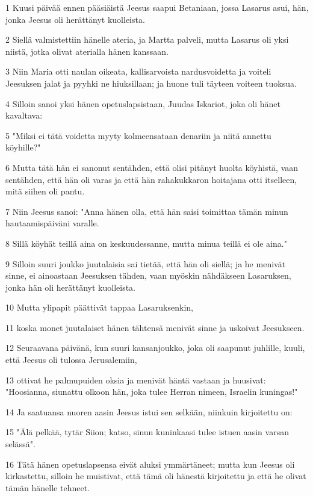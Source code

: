 \par 1 Kuusi päivää ennen pääsiäistä Jeesus saapui Betaniaan, jossa Lasarus asui, hän, jonka Jeesus oli herättänyt kuolleista.
\par 2 Siellä valmistettiin hänelle ateria, ja Martta palveli, mutta Lasarus oli yksi niistä, jotka olivat aterialla hänen kanssaan.
\par 3 Niin Maria otti naulan oikeata, kallisarvoista nardusvoidetta ja voiteli Jeesuksen jalat ja pyyhki ne hiuksillaan; ja huone tuli täyteen voiteen tuoksua.
\par 4 Silloin sanoi yksi hänen opetuslapsistaan, Juudas Iskariot, joka oli hänet kavaltava:
\par 5 "Miksi ei tätä voidetta myyty kolmeensataan denariin ja niitä annettu köyhille?"
\par 6 Mutta tätä hän ei sanonut sentähden, että olisi pitänyt huolta köyhistä, vaan sentähden, että hän oli varas ja että hän rahakukkaron hoitajana otti itselleen, mitä siihen oli pantu.
\par 7 Niin Jeesus sanoi: "Anna hänen olla, että hän saisi toimittaa tämän minun hautaamispäiväni varalle.
\par 8 Sillä köyhät teillä aina on keskuudessanne, mutta minua teillä ei ole aina."
\par 9 Silloin suuri joukko juutalaisia sai tietää, että hän oli siellä; ja he menivät sinne, ei ainoastaan Jeesuksen tähden, vaan myöskin nähdäkseen Lasaruksen, jonka hän oli herättänyt kuolleista.
\par 10 Mutta ylipapit päättivät tappaa Lasaruksenkin,
\par 11 koska monet juutalaiset hänen tähtensä menivät sinne ja uskoivat Jeesukseen.
\par 12 Seuraavana päivänä, kun suuri kansanjoukko, joka oli saapunut juhlille, kuuli, että Jeesus oli tulossa Jerusalemiin,
\par 13 ottivat he palmupuiden oksia ja menivät häntä vastaan ja huusivat: "Hoosianna, siunattu olkoon hän, joka tulee Herran nimeen, Israelin kuningas!"
\par 14 Ja saatuansa nuoren aasin Jeesus istui sen selkään, niinkuin kirjoitettu on:
\par 15 "Älä pelkää, tytär Siion; katso, sinun kuninkaasi tulee istuen aasin varsan selässä".
\par 16 Tätä hänen opetuslapsensa eivät aluksi ymmärtäneet; mutta kun Jeesus oli kirkastettu, silloin he muistivat, että tämä oli hänestä kirjoitettu ja että he olivat tämän hänelle tehneet.
